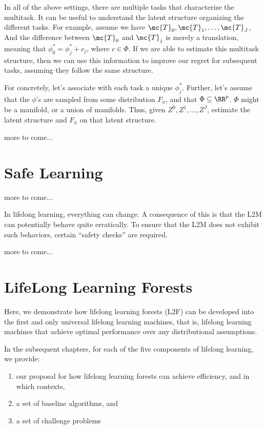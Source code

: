 \documentclass{article}
\begin{document}

In all of the above settings, there are multiple tasks that characterize the multitask.  It can be useful to understand the latent structure organizing the different tasks.  For example, assume we have $\mc{T}_0, \mc{T}_1, \ldots, \mc{T}_J$, And the difference between $\mc{T}_0$ and $\mc{T}_j$ is merely a translation, meaning that $\phi_0^* = \phi_j^* + c_j$, where $c \in \Phi$. If we are able to estimate this multitask structure, then we can use this information to improve our regret for subsequent tasks, assuming they follow the same structure.  

For concretely, let's associate with each task a unique $\phi^*_j$.  Further, let's assume that the $\phi$'s are sampled from some distribution $F_\phi$, and that $\Phi \subseteq \RR^p$.  $\Phi$ might be a manifold, or a union of manifolds. Thus, given $Z^0, Z^1, \ldots, Z^J$, estimate the latent structure and $F_\phi$ on that latent structure.   

more to come...

\section{Safe Learning}
\label{sec:safe}

more to come...

In lifelong learning, everything can change.  A consequence of this is that the L2M can potentially behave quite erratically.  To ensure that the L2M does not exhibit such behaviors, certain ``safety checks'' are required.  




\clearpage
\appendix

more to come...

\section{LifeLong Learning Forests}

Here, we demonstrate how lifelong learning forests (L2F) can be developed into the first and only universal lifelong learning machines, that is, lifelong learning machines that achieve optimal performance over any distributional assumptions.

In the subsequent chapters,  for each of the five components of lifelong learning, we provide:
\begin{enumerate}
    \item our proposal for how lifelong learning forests can achieve efficiency, and in which contexts,
    \item a set of baseline algorithms, and
    \item a set of challenge problems
\end{enumerate}
\end{document}

